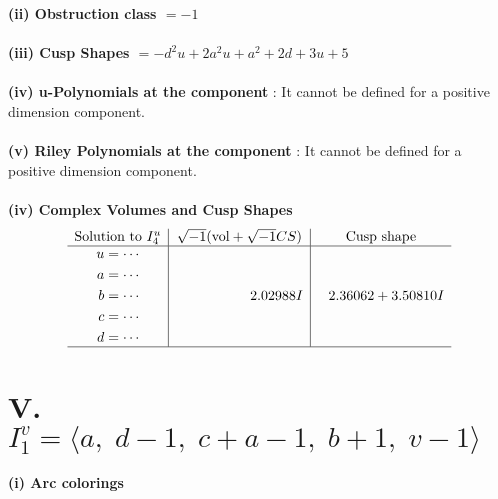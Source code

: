 \documentclass[1p]{elsarticle_modified}
\theoremstyle{definition}
\newcommand{\I}{\sqrt{-1}}
\begin{document}
\flushleft \textbf{(ii) Obstruction class $= -1$}\\~\\
\flushleft \textbf{(iii) Cusp Shapes $= - d^2 u+2 a^2 u+a^2+2 d+3 u+5$}\\~\\
\flushleft \textbf{(iv) u-Polynomials at the component} : It cannot be defined for a positive dimension component.\\~\\
\flushleft \textbf{(v) Riley Polynomials at the component} : It cannot be defined for a positive dimension component.\\~\\
\newpage\flushleft \textbf{(iv) Complex Volumes and Cusp Shapes}
$$\begin{array}{c|c|c} 
\text{Solution to }I^u_{4}& \I (\text{vol} + \sqrt{-1}CS) & \text{Cusp shape}\\
 \hline 
\begin{aligned}
u &= \cdots \\
a &= \cdots \\
b &= \cdots \\
c &= \cdots \\
d &= \cdots\end{aligned}
 & \phantom{-0.000000 -}2.02988 I & \phantom{-}2.36062 + 3.50810 I\\
 \hline 
 \end{array}
$$\newpage\renewcommand{\arraystretch}{1}
\centering \section*{V. $I^v_{1}= \langle a,\;d-1,\;c+a-1,\;b+1,\;v-1 \rangle$}
\flushleft \textbf{(i) Arc colorings}\\
\end{document}
